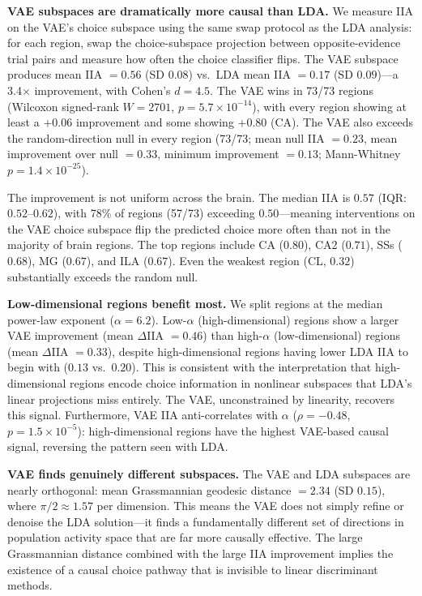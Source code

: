\documentclass{article}
\begin{document}
\textbf{VAE subspaces are dramatically more causal than LDA.} We measure IIA on the VAE's choice subspace using the same swap protocol as the LDA analysis: for each region, swap the choice-subspace projection between opposite-evidence trial pairs and measure how often the choice classifier flips. The VAE subspace produces mean IIA $= 0.56$ (SD $0.08$) vs.\ LDA mean IIA $= 0.17$ (SD $0.09$)---a 3.4$\times$ improvement, with Cohen's $d = 4.5$. The VAE wins in 73/73 regions (Wilcoxon signed-rank $W = 2701$, $p = 5.7 \times 10^{-14}$), with every region showing at least a $+0.06$ improvement and some showing $+0.80$ (CA). The VAE also exceeds the random-direction null in every region (73/73; mean null IIA $= 0.23$, mean improvement over null $= 0.33$, minimum improvement $= 0.13$; Mann-Whitney $p = 1.4 \times 10^{-25}$).

The improvement is not uniform across the brain. The median IIA is $0.57$ (IQR: $0.52$--$0.62$), with 78\% of regions (57/73) exceeding $0.50$---meaning interventions on the VAE choice subspace flip the predicted choice more often than not in the majority of brain regions. The top regions include CA ($0.80$), CA2 ($0.71$), SSs ($0.68$), MG ($0.67$), and ILA ($0.67$). Even the weakest region (CL, $0.32$) substantially exceeds the random null.

\textbf{Low-dimensional regions benefit most.} We split regions at the median power-law exponent ($\alpha = 6.2$). Low-$\alpha$ (high-dimensional) regions show a larger VAE improvement (mean $\Delta$IIA $= 0.46$) than high-$\alpha$ (low-dimensional) regions (mean $\Delta$IIA $= 0.33$), despite high-dimensional regions having lower LDA IIA to begin with ($0.13$ vs.\ $0.20$). This is consistent with the interpretation that high-dimensional regions encode choice information in nonlinear subspaces that LDA's linear projections miss entirely. The VAE, unconstrained by linearity, recovers this signal. Furthermore, VAE IIA anti-correlates with $\alpha$ ($\rho = -0.48$, $p = 1.5 \times 10^{-5}$): high-dimensional regions have the highest VAE-based causal signal, reversing the pattern seen with LDA.

\textbf{VAE finds genuinely different subspaces.} The VAE and LDA subspaces are nearly orthogonal: mean Grassmannian geodesic distance $= 2.34$ (SD $0.15$), where $\pi/2 \approx 1.57$ per dimension. This means the VAE does not simply refine or denoise the LDA solution---it finds a fundamentally different set of directions in population activity space that are far more causally effective. The large Grassmannian distance combined with the large IIA improvement implies the existence of a causal choice pathway that is invisible to linear discriminant methods.
\end{document}
